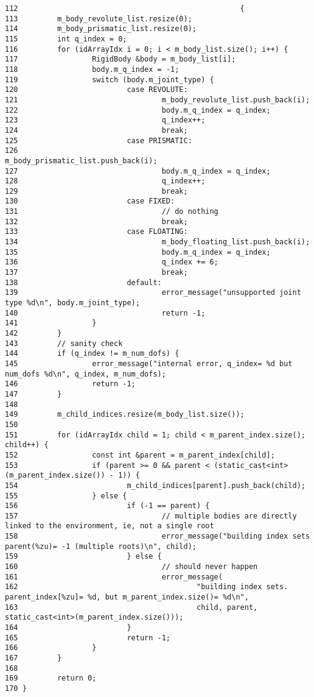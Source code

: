 \begin{Code}\begin{verbatim}112                                                   {
113         m_body_revolute_list.resize(0);
114         m_body_prismatic_list.resize(0);
115         int q_index = 0;
116         for (idArrayIdx i = 0; i < m_body_list.size(); i++) {
117                 RigidBody &body = m_body_list[i];
118                 body.m_q_index = -1;
119                 switch (body.m_joint_type) {
120                         case REVOLUTE:
121                                 m_body_revolute_list.push_back(i);
122                                 body.m_q_index = q_index;
123                                 q_index++;
124                                 break;
125                         case PRISMATIC:
126                                 m_body_prismatic_list.push_back(i);
127                                 body.m_q_index = q_index;
128                                 q_index++;
129                                 break;
130                         case FIXED:
131                                 // do nothing
132                                 break;
133                         case FLOATING:
134                                 m_body_floating_list.push_back(i);
135                                 body.m_q_index = q_index;
136                                 q_index += 6;
137                                 break;
138                         default:
139                                 error_message("unsupported joint type %d\n", body.m_joint_type);
140                                 return -1;
141                 }
142         }
143         // sanity check
144         if (q_index != m_num_dofs) {
145                 error_message("internal error, q_index= %d but num_dofs %d\n", q_index, m_num_dofs);
146                 return -1;
147         }
148 
149         m_child_indices.resize(m_body_list.size());
150 
151         for (idArrayIdx child = 1; child < m_parent_index.size(); child++) {
152                 const int &parent = m_parent_index[child];
153                 if (parent >= 0 && parent < (static_cast<int>(m_parent_index.size()) - 1)) {
154                         m_child_indices[parent].push_back(child);
155                 } else {
156                         if (-1 == parent) {
157                                 // multiple bodies are directly linked to the environment, ie, not a single root
158                                 error_message("building index sets parent(%zu)= -1 (multiple roots)\n", child);
159                         } else {
160                                 // should never happen
161                                 error_message(
162                                         "building index sets. parent_index[%zu]= %d, but m_parent_index.size()= %d\n",
163                                         child, parent, static_cast<int>(m_parent_index.size()));
164                         }
165                         return -1;
166                 }
167         }
168 
169         return 0;
170 }
\end{verbatim}
\end{Code}




